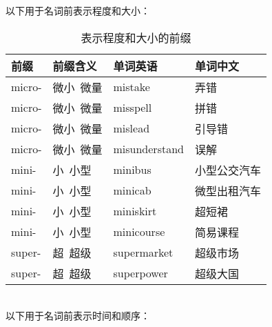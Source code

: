 \documentclass[UTF8]{ctexart}
\begin{document}
    以下用于名词前表示程度和大小：\vspace{5pt}
    \begin{table}[h!]
        \begin{center}
            \ttfamily
            \begin{tabular}{p{40pt}|p{80pt}|p{80pt}|p{80pt}}
                \hline
                前缀&前缀含义&单词英语&单词中文\\ \hline
                micro-&微小~微量&mistake&弄错\\ \hline
                micro-&微小~微量&misspell&拼错\\ \hline
                micro-&微小~微量&mislead&引导错\\ \hline
                micro-&微小~微量&misunderstand&误解\\ \hline
                mini-&小~小型&minibus&小型公交汽车\\ \hline
                mini-&小~小型&minicab&微型出租汽车\\ \hline
                mini-&小~小型&miniskirt&超短裙\\ \hline
                mini-&小~小型&minicourse&简易课程\\ \hline
                super-&超~超级&supermarket&超级市场\\ \hline
                super-&超~超级&superpower&超级大国\\ \hline
            \end{tabular}
            \rmfamily
            \caption{表示程度和大小的前缀}
        \end{center}
    \end{table}\\
    以下用于名词前表示时间和顺序：\vspace{5pt}
\end{document}
